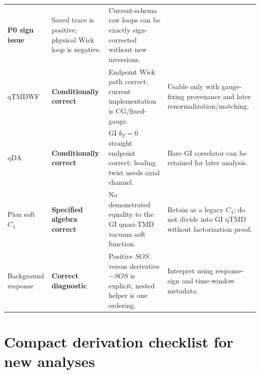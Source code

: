 \documentclass[11pt,a4paper]{article}
\numberwithin{equation}{section}
\newcommand{\good}[1]{\textcolor{auditgreen}{\textbf{#1}}}
\newcommand{\warn}[1]{\textcolor{auditamber}{\textbf{#1}}}
\newcommand{\bad}[1]{\textcolor{auditred}{\textbf{#1}}}
\begin{document}
\begin{longtable}{@{}L{0.17\textwidth}L{0.19\textwidth}L{0.34\textwidth}L{0.22\textwidth}@{}}
\bad{P0 sign issue} &
Saved trace is positive; physical Wick loop is negative. &
Current-schema raw loops can be exactly sign-corrected without new inversions.\\
qTMDWF &
\warn{Conditionally correct} &
Endpoint Wick path correct; current implementation is CG/fixed-gauge. &
Usable only with gauge-fixing provenance and later renormalization/matching.\\
qDA &
\warn{Conditionally correct} &
GI \(b_T=0\) straight endpoint correct; leading twist needs axial channel. &
Bare GI correlator can be retained for later analysis.\\
Pion soft \(C_4\) &
\warn{Specified algebra correct} &
No demonstrated equality to the GI quasi-TMD vacuum soft function. &
Retain as a legacy \(C_4\); do not divide into GI qTMD without factorization proof.\\
Background response &
\good{Correct diagnostic} &
Positive \(SOS\) versus derivative \(-SOS\) is explicit; nested helper is one ordering. &
Interpret using response-sign and time-window metadata.\\
\bottomrule
\end{longtable}

\section{Compact derivation checklist for new analyses}
\end{document}
